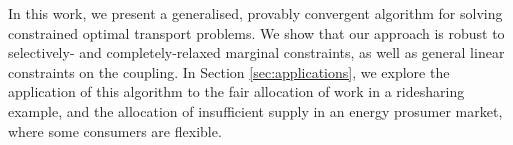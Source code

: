 \documentclass[twocolumn]{article}
\begin{document}
In this work, we present a generalised, provably convergent algorithm for solving constrained optimal transport problems. We show that our approach is robust to selectively- and completely-relaxed marginal constraints, as well as general linear constraints on the coupling. In Section \ref{sec:applications}, we explore the application of this algorithm to the fair allocation of work in a ridesharing example, and the allocation of insufficient supply in an energy prosumer market, where some consumers are flexible.



\end{document}
